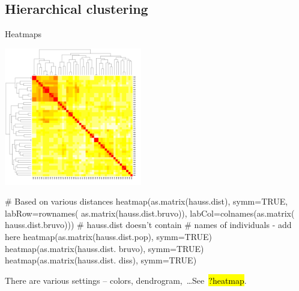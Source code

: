 \documentclass[compress, ucs, xelatex, 11pt, xcolor=svgnames,
  hyperref={
    bookmarks=true,
    unicode=true,
    colorlinks=true,
    pdftitle={Molecular data in R},
    plainpages=false,
    pdfauthor={Vojtech Zeisek},
    pdfsubject={Course about phylogeny and evolution in R},
    pdfcreator={XeLaTeX},
    pdfkeywords={R, evolution, phylogeny, molecular data},
    linkcolor=Tomato,
    anchorcolor=SaddleBrown,
    citecolor=Goldenrod,
    filecolor=DarkMagenta,
    menucolor=Sienna,
    urlcolor=DarkTurquoise,
    pdftex},
  url={hyphens, lowtilde} %
  ]{beamer}
\renewcommand{\texttt}[1]{\hl{\ttfamily #1}}
\begin{document}
\subsection{Hierarchical clustering}

\begin{frame}[fragile]{Heatmaps}
\label{hierclust}
\begin{multicols}{2}
  \includegraphics[height=6cm]{heatmap.png}
  \columnbreak
  \begin{spluscode}
    # Based on various distances
    heatmap(as.matrix(hauss.dist),
      symm=TRUE, labRow=rownames(
      as.matrix(hauss.dist.bruvo)),
      labCol=colnames(as.matrix(
      hauss.dist.bruvo)))
      # hauss.dist doesn't contain
      # names of individuals - add here
    heatmap(as.matrix(hauss.dist.pop),
      symm=TRUE)
    heatmap(as.matrix(hauss.dist.
      bruvo), symm=TRUE)
    heatmap(as.matrix(hauss.dist.
      diss), symm=TRUE)
  \end{spluscode}
  \begin{footnotesize}
  There are various settings -- colors, dendrogram,~\ldots See~\texttt{?heatmap}.
  \end{footnotesize}
\end{multicols}
\end{frame}
\end{document}
